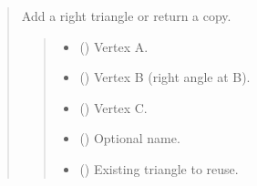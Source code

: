 \documentclass[letterpaper,10pt,english]{sphinxmanual}
\begin{document}
\begin{quote}
\begin{fulllineitems}
\begin{fulllineitems}
\label{\detokenize{pygeox:pygeox.add_objects.AddNamespace.right_triangle}}
\pysigstartsignatures
\pysiglinewithargsret
{}
{\sphinxparamcomma {}\sphinxparamcomma {}\sphinxparamcomma {}\sphinxparamcomma {}}
{}
\pysigstopsignatures
\sphinxAtStartPar
Add a right triangle or return a copy.
\begin{quote}\begin{description}
\begin{itemize}
\item {} 
\sphinxAtStartPar
{} (\sphinxstyleliteralemphasis{\sphinxupquote{ | }}) \textendash{} Vertex A.

\item {} 
\sphinxAtStartPar
{} (\sphinxstyleliteralemphasis{\sphinxupquote{ | }}) \textendash{} Vertex B (right angle at B).

\item {} 
\sphinxAtStartPar
{} (\sphinxstyleliteralemphasis{\sphinxupquote{ | }}) \textendash{} Vertex C.

\item {} 
\sphinxAtStartPar
{} (\sphinxstyleliteralemphasis{\sphinxupquote{ | }}) \textendash{} Optional name.

\item {} 
\sphinxAtStartPar
{} (\sphinxstyleliteralemphasis{\sphinxupquote{ | }}) \textendash{} Existing triangle to reuse.


\end{itemize}
\end{description}
\end{quote}
\end{fulllineitems}
\end{fulllineitems}
\end{quote}
\end{document}
